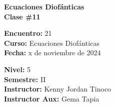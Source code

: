 \begin{center} \textbf
{
    \Large Ecuaciones Diofánticas \\ \vspace{2mm}Clase \#11
}
\end{center}

\begin{multicols}{2}
{
    \textbf{Encuentro:} 21\\
    \textbf{Curso:} Ecuaciones Diofánticas\\
    \textbf{Fecha:} x de noviembre de 2024\\
    \begin{flushright}
        \textbf{Nivel:} 5\\
        \textbf{Semestre:} II\\
        \textbf{Instructor:} Kenny Jordan Tinoco\\
        \textbf{Instructor Aux:} Gema Tapia
    \end{flushright}
}
\end{multicols}

\thispagestyle{first-page-style}